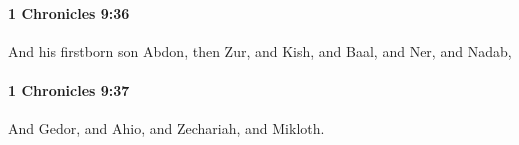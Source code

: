 		\paragraph{1 Chronicles 9:36} %
			\label{1CHRONICLES-9-36}

			And his firstborn son Abdon, then Zur, and Kish, and Baal, and Ner, and Nadab,


		\paragraph{1 Chronicles 9:37} %
			\label{1CHRONICLES-9-37}

			And Gedor, and Ahio, and Zechariah, and Mikloth.


